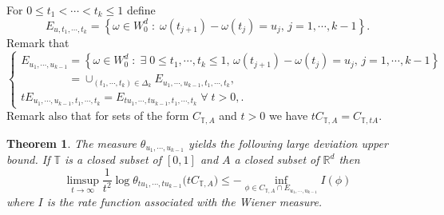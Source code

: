\documentclass[]{interact}
\newcommand{\R}{{\mathbb{R}}}
\newcommand{\1}{\mathbf{1}}
\theoremstyle{plain}%
\newtheorem{thm}{Theorem}[section]
\theoremstyle{definition}
\theoremstyle{remark}
\begin{document}
\noindent For $0\leqslant t_1 < \cdots <t_k \leqslant 1$ define 
$$ E_{u,t_1,\cdots,t_k}=\left\lbrace \omega \in W_0^d\; : \; \omega(t_{j+1})- \omega(t_j)=u_j,\,j=1,\cdots,k-1\right\rbrace .  $$
Remark that 
$$\begin{cases}
E_{u_1,\cdots,u_{k-1}}=\left\lbrace \omega \in W_0^d\; : \; \exists \;0\leqslant t_1,\cdots,t_k \leqslant 1,\, \omega(t_{j+1})- \omega(t_j)=u_j,\,j=1,\cdots,k-1 \right\rbrace \\
\phantom{ E_{u_1,\cdots,u_{k-1}} }=\cup _{(t_1,\cdots,t_k)\in \Delta_k} E_{u_1,\cdots,u_{k-1},t_1,\cdots,t_k},\\
tE_{u_1,\cdots,u_{k-1},t_1,\cdots,t_k}=E_{tu_1,\cdots,tu_{k-1},t_1,\cdots,t_k} \; \forall \; t>0,.
\end{cases}$$
Remark also that for sets of the form $C_{\mathbb{T},A}$ and $t>0$ we have $ tC_{\mathbb{T},A}=C_{\mathbb{T},tA} $.\\


\begin{thm}\label{thm560}
The measure $\theta_{u_1,\cdots,u_{k-1}}$ yields the following large deviation upper bound. If $\mathbb{T}$ is a closed subset of $[0,1]$ and $A$ a closed subset of $\R^{d}$ then
$$ \limsup_{t \to \infty}  \frac{1}{t^2} \log \theta_{tu_1,\cdots,tu_{k-1}} \big(tC_{\mathbb{T},A}\big) \leqslant -\inf _{\phi \in  C_{\mathbb{T},A} \cap E_ {u_1,\cdots,u_{k-1} }} I(\phi) $$
where $I$ is the rate function associated with the Wiener measure. 
\end{thm}
\end{document}
